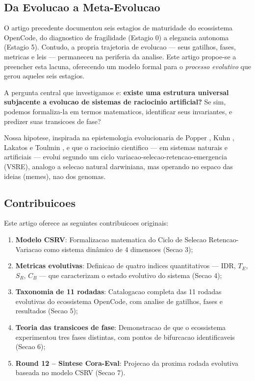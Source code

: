 \documentclass[5p]{elsarticle}
\begin{document}
\subsection{Da Evolucao a Meta-Evolucao}

O artigo precedente \cite{evolucao2026} documentou seis estagios de
maturidade do ecossistema OpenCode, do diagnostico de fragilidade (Estagio 0)
a elegancia autonoma (Estagio 5). Contudo, a propria trajetoria de evolucao
--- seus gatilhos, fases, metricas e leis --- permaneceu na periferia da
analise. Este artigo propoe-se a preencher esta lacuna, oferecendo um modelo
formal para o \textit{processo evolutivo} que gerou aqueles seis estagios.

A pergunta central que investigamos e: \textbf{existe uma estrutura universal
subjacente a evolucao de sistemas de raciocinio artificial?} Se sim, podemos
formaliza-la em termos matematicos, identificar seus invariantes, e predizer
suas transicoes de fase?

Nossa hipotese, inspirada na epistemologia evolucionaria de Popper \cite{popper1959},
Kuhn \cite{kuhn1962}, Lakatos \cite{lakatos1976} e Toulmin \cite{toulmin1972},
e que o raciocinio cientifico --- em sistemas naturais e artificiais --- evolui
segundo um ciclo variacao-selecao-retencao-emergencia (VSRE), analogo a selecao
natural darwiniana, mas operando no espaco das ideias (memes), nao dos genomas.

\subsection{Contribuicoes}

Este artigo oferece as seguintes contribuicoes originais:

\begin{enumerate}[label=(\roman*)]
  \item \textbf{Modelo CSRV}: Formalizacao matematica do Ciclo de Selecao
    Retencao-Variacao como sistema dinâmico de 4 dimensoes (Secao 3);
  \item \textbf{Metricas evolutivas}: Definicao de quatro indices quantitativos
    --- IDR, $T_E$, $S_R$, $C_B$ --- que caracterizam o estado evolutivo do
    sistema (Secao 4);
  \item \textbf{Taxonomia de 11 rodadas}: Catalogacao completa das 11 rodadas
    evolutivas do ecossistema OpenCode, com analise de gatilhos, fases e
    resultados (Secao 5);
  \item \textbf{Teoria das transicoes de fase}: Demonstracao de que o ecossistema
    experimentou tres fases distintas, com pontos de bifurcacao identificaveis
    (Secao 6);
  \item \textbf{Round 12 -- Sintese Cora-Eval}: Projecao da proxima rodada
    evolutiva baseada no modelo CSRV (Secao 7).
\end{enumerate}
\end{document}
